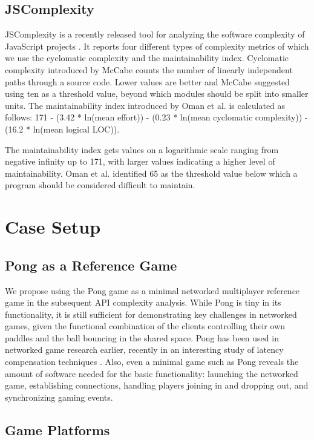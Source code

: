 \documentclass[conference]{IEEEtran}
\begin{document}
\subsection{JSComplexity}

JSComplexity is a recently released tool for analyzing the software
complexity of JavaScript projects \cite{jscomplexity}. It reports four
different types of complexity metrics of which we use the cyclomatic
complexity and the maintainability index.  Cyclomatic complexity
introduced by McCabe \cite{mccabe} counts the number of linearly
independent paths through a source code. Lower values are better and
McCabe suggested using ten as a threshold value, beyond which modules
should be split into smaller units.  The maintainability index
introduced by Oman et al. \cite{oman} is calculated as follows: 171 -
(3.42 * ln(mean effort)) - (0.23 * ln(mean cyclomatic complexity)) -
(16.2 * ln(mean logical LOC)).

The maintainability index gets values on a logarithmic scale ranging
from negative infinity up to 171, with larger values indicating a
higher level of maintainability. Oman et al. identified 65 as the
threshold value below which a program should be considered difficult
to maintain.

\section{Case Setup}

\subsection{Pong as a Reference Game}

We propose using the Pong game as a minimal networked multiplayer
reference game in the subsequent API complexity analysis. While Pong
is tiny in its functionality, it is still sufficient for demonstrating
key challenges in networked games, given the functional combination of
the clients controlling their own paddles and the ball bouncing in the
shared space. Pong has been used in networked game research earlier,
recently in an interesting study of latency compensation techniques
\cite{pong-ping}. Also, even a minimal game such as Pong reveals the
amount of software needed for the basic functionality: launching the
networked game, establishing connections, handling players joining in
and dropping out, and synchronizing gaming events.

\subsection{Game Platforms}
\end{document}
